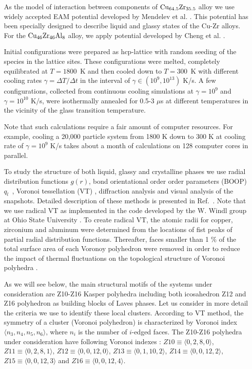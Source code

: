 \documentclass[jcp,twocolumn,superscriptaddress,floatfix,graphicx,showpacs]{revtex4-1}
\begin{document}
As the model of interaction between components of ${\rm Cu_{64.5}Zr_{35.5}}$ alloy we use widely accepted EAM potential developed by Mendelev et al. \cite{Mendelev2009PhilMag,Zhang2015PRB}. This potential has been specially designed to describe liquid and glassy states of the Cu-Zr alloys. For the ${\rm Cu_{46}Zr_{46}Al_{8}}$ alloy, we apply potential developed by Cheng et al. \cite{Cheng2009PRL}.

Initial configurations were prepared as hcp-lattice with random seeding of the species in the lattice sites. These configurations were melted, completely equilibrated at $T=1800$~K and then cooled down to $T=300$~K with different cooling rates $\gamma=\Delta T/\Delta t$ in the interval of $\gamma\in(10^{9}, 10^{13})$ K/s. A few configurations, collected from continuous cooling simulations at $\gamma=10^{9}$ and $\gamma=10^{10}$ K/s, were isothermally annealed for 0.5-3 $\mu$s at different temperatures in the vicinity of the glass transition temperature.

Note that such calculations require a fair amount of computer resources. For example, cooling a 20,000 particle system from 1800 K down to 300 K at cooling rate of $\gamma = 10^{9}$ K/s takes about a month of calculations on 128 computer cores in parallel.

To study the structure of both liquid, glassy and crystalline phases we use radial distribution functions $g(r)$, bond orientational order order parameters (BOOP) $q_l$~\cite{Steinhardt1981PRL,Steinhardt1983PRB,Hirata2013Science}, Voronoi tessellation (VT) \cite{Finney1977Nature,Brostow1998PRB}, diffraction analysis and visual analysis of the snapshots. Detailed description of these methods is presented in Ref.~\cite{Ryltsev2015SoftMatt,Ryltsev2016JCP}. Note that we use radical VT \cite{Gellatly1982JNCS} as implemented in the code developed by the W. Windl group at Ohio State University \cite{Ward2013PRB}. To create radical VT, the atomic radii for copper, zirconium and aluminum were determined from the locations of fist peaks of partial radial distribution functions. Thereafter, faces smaller than 1 \% of
the total surface area of each Voronoy polyhedron were removed in order to reduce the impact of thermal fluctuations on the topological structure of Voronoi polyhedra \cite{Troadec1998EPL,Brostow1998PRB,vanMeel2012JCP}.

As we will see below, the main structural motifs of the systems under consideration are Z10-Z16 Kasper polyhedra including both icosahedron Z12 and Z16 polyhedron as building blocks of Laves phases. Let us consider in more detail the criteria we use to identify these local clusters. According to VT method, the symmetry of a cluster (Voronoi polyhedron) is characterized by Voronoi index $\langle n_3, n_4, n_5, n_6\rangle$, where $n_i$ is the number of $i$-edged faces. The Z10-Z16 polyhedra under consideration have following Voronoi indexes \cite{Cheng2011ProgMateSci}: $Z10 \equiv\langle 0, 2, 8, 0 \rangle$,  $Z11 \equiv\langle 0, 2, 8, 1 \rangle$,  $Z12 \equiv\langle 0, 0, 12, 0 \rangle$, $Z13 \equiv\langle 0, 1, 10, 2 \rangle$,  $Z14 \equiv\langle 0, 0, 12, 2 \rangle$, $Z15 \equiv\langle 0, 0, 12, 3 \rangle$  and $Z16 \equiv\langle 0, 0, 12, 4 \rangle$.
\end{document}
